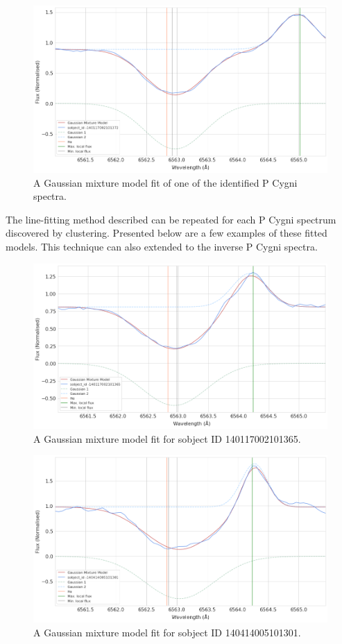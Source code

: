 \begin{figure}[!htb]
\centering
\includegraphics[scale=0.45]{figures/p cugni fitted.png}
\caption{A Gaussian mixture model fit of one of the identified P Cygni spectra.}
\end{figure}

The line-fitting method described can be repeated for each P Cygni spectrum discovered by clustering. Presented below are a few examples of these fitted models. This technique can also extended to the inverse P Cygni spectra.

\begin{figure}[!htb]
\centering
\includegraphics[scale=0.45]{figures/p cygni fitted 2.png}
\caption{A Gaussian mixture model fit for sobject ID 140117002101365. }
\end{figure}

\begin{figure}[!htb]
\centering
\includegraphics[scale=0.45]{figures/p cygni fitted 3.png}
\caption{A Gaussian mixture model fit for sobject ID 140414005101301. }
\end{figure}

